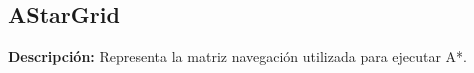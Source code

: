 



\newpage
\subsection{AStarGrid}
\textbf{Descripción: }Representa la matriz navegación utilizada para ejecutar A*.

